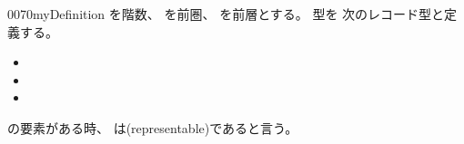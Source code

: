 \documentclass[index]{subfiles}
\begin{document}
\begin{myBlock}{0070}{myDefinition}
  を階数、
  を前圏、
  を前層とする。
  型を
  次のレコード型と定義する。
  \begin{itemize}
  \item {}
  \item {}
  \item {}
  \end{itemize}
  の要素がある時、
  は(representable)であると言う。
\end{myBlock}
\end{document}
